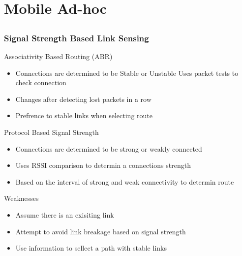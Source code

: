\section{Mobile Ad-hoc}
\subsection*{}


\begin{frame}[t]
  \frametitle{Signal Strength Based Link Sensing}
  
  Associativity Based Routing (ABR)
  \begin{itemize}
  \item Connections are determined to be Stable or Unstable
  \irem Uses packet tests to check connection
  \item Changes after detecting lost packets in a row
  \item Prefrence to stable links when selecting route
  \end{itemize}

  \vfill
  
  Protocol Based Signal Strength
  \begin{itemize}
  \item Connections are determined to be strong or weakly connected
  \item Uses RSSI comparison to determin a connections strength
  \item Based on the interval of strong and weak connectivity to determin route
  \end{itemize}

  \vfill

  Weaknesses
  \begin{itemize}
    \item Assume there is an exisiting link
    \item Attempt to avoid link breakage based on signal strength
    \item Use information to sellect a path with stable links
  \end{itemize}

  \vfill

  \begin{flushleft}
    \begin{tiny}
      \begin{minipage}{1.0\linewidth}
      \end{minipage}
    \end{tiny}
  \end{flushleft}
  
\end{frame}

